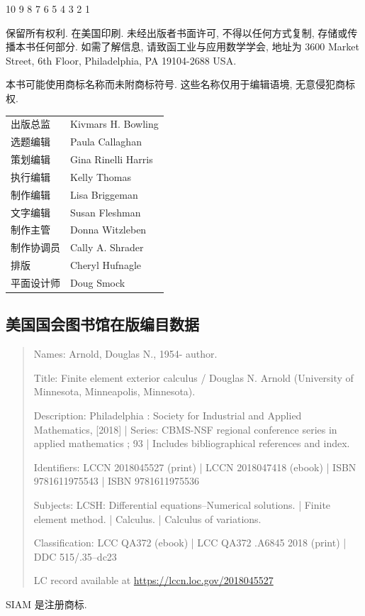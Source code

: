 10 9 8 7 6 5 4 3 2 1

{保留所有权利. 在美国印刷. 未经出版者书面许可, 不得以任何方式复制, 存储或传播本书任何部分. 如需了解信息, 请致函工业与应用数学学会, 地址为 3600 Market Street, 6th Floor, Philadelphia, PA 19104-2688 USA.}

{本书可能使用商标名称而未附商标符号. 这些名称仅用于编辑语境, 无意侵犯商标权.}

\begin{center}\begin{tabular}{ll}
{出版总监}&Kivmars H. Bowling\\
{选题编辑}&Paula Callaghan\\
{策划编辑}&Gina Rinelli Harris\\
{执行编辑}&Kelly Thomas\\
{制作编辑}&Lisa Briggeman\\
{文字编辑}&Susan Fleshman\\
{制作主管}&Donna Witzleben\\
{制作协调员}&Cally A. Shrader\\
{排版}&Cheryl Hufnagle\\
{平面设计师}&Doug Smock
\end{tabular}\end{center}

\subsection*{{美国国会图书馆在版编目数据}}
\begin{quote}\small
Names: Arnold, Douglas N., 1954- author.\par
Title: Finite element exterior calculus / Douglas N. Arnold (University of Minnesota, Minneapolis, Minnesota).\par
Description: Philadelphia : Society for Industrial and Applied Mathematics, [2018] | Series: CBMS-NSF regional conference series in applied mathematics ; 93 | Includes bibliographical references and index.\par
Identifiers: LCCN 2018045527 (print) | LCCN 2018047418 (ebook) \newline | ISBN 9781611975543 | ISBN 9781611975536\par
Subjects: LCSH: Differential equations--Numerical solutions. | Finite element method. | Calculus. | Calculus of variations.\par
Classification: LCC QA372 (ebook) | LCC QA372 .A6845 2018 (print) | DDC 515/.35--dc23\par
LC record available at \url{https://lccn.loc.gov/2018045527}
\end{quote}

{SIAM 是注册商标.}
\clearpage
